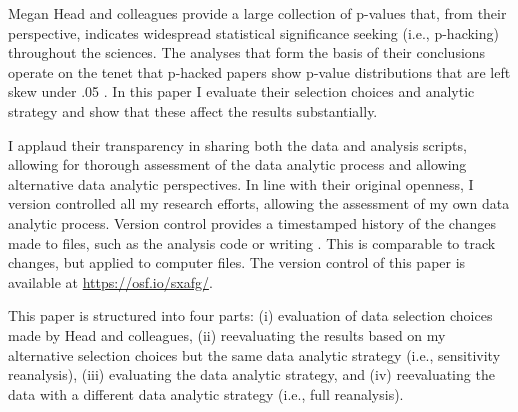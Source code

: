 Megan Head and colleagues provide a large collection of p-values that, from their perspective, indicates widespread statistical significance seeking (i.e., p-hacking) throughout the sciences. The analyses that form the basis of their conclusions operate on the tenet that p-hacked papers show p-value distributions that are left skew under .05 \cite{Simonsohn2014}. In this paper I evaluate their selection choices and analytic strategy and show that these affect the results substantially. 

I applaud their transparency in sharing both the data and analysis scripts, allowing for thorough assessment of the data analytic process and allowing alternative data analytic perspectives. In line with their original openness, I version controlled all my research efforts, allowing the assessment of my own data analytic process. Version control provides a timestamped history of the changes made to files, such as the analysis code or writing \cite{Ram2013}. This is comparable to track changes, but applied to computer files. The version control of this paper is available at \href{https://osf.io/sxafg/}{https://osf.io/sxafg/}.

This paper is structured into four parts: (i) evaluation of data selection choices made by Head and colleagues, (ii) reevaluating the results based on my alternative selection choices but the same data analytic strategy (i.e., sensitivity reanalysis), (iii) evaluating the data analytic strategy, and (iv) reevaluating the data with a different data analytic strategy (i.e., full reanalysis). 
  